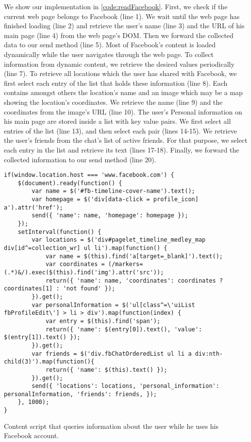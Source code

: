	We show our implementation in \autoref{code:readFacebook}. First, we check if the current web page belongs to Facebook (line 1). We wait until the web page has finished loading (line 2) and retrieve the user's name (line 3) and the URL of his main page (line 4) from the web page's DOM. Then we forward the collected data to our send method (line 5). Most of Facebook's content is loaded dynamically while the user navigates through the web page. To collect information from dynamic content, we retrieve the desired values periodically (line 7). To retrieve all locations which the user has shared with Facebook, we first select each entry of the list that holds these information (line 8). Each contains amongst others the location's name and an image which may be a map showing the location's coordinates. We retrieve the name (line 9) and the coordinates from the image's URL (line 10). The user's Personal information on his main page are stored inside a list with key value pairs. We first select all entries of the list (line 13), and then select each pair (lines 14-15). We retrieve the user's friends from the chat's list of active friends. For that purpose, we select each entry in the list and retrieve its text (lines 17-18). Finally, we forward the collected information to our send method (line 20).

	\begin{code}
		\begin{lstlisting}
if(window.location.host === 'www.facebook.com') {
	$(document).ready(function() {
		var name = $('#fb-timeline-cover-name').text();
		var homepage = $('div[data-click = profile_icon] a').attr('href');
		send({ 'name': name, 'homepage': homepage });
	});
	setInterval(function() {
		var locations = $('div#pagelet_timeline_medley_map div[id^=collection_wr] ul li').map(function() {
			var name = $(this).find('a[target=_blank]').text();
			var coordinates = (/markers=(.*)&/).exec($(this).find('img').attr('src'));
			return({ 'name': name, 'coordinates': coordinates ? coordinates[1] : 'not found' });
		}).get();
		var personalInformation = $('ul[class^=\'uiList fbProfileEdit\'] > li > div').map(function(index) {
			var entry = $(this).find('span');
			return({ 'name': $(entry[0]).text(), 'value': $(entry[1]).text() });
		}).get();
		var friends = $('div.fbChatOrderedList ul li a div:nth-child(3)').map(function(){
			return({ 'name': $(this).text() });
		}).get();
		send({ 'locations': locations, 'personal_information': personalInformation, 'friends': friends, });
	}, 1000);
}
\end{lstlisting}
		\caption{Content script that queries information about the user while he uses his Facebook account.}
		\label{code:readFacebook}
	\end{code}


